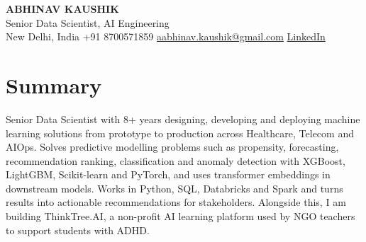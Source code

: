 \documentclass[10pt,a4paper]{article}
\begin{document}
\begin{center}
  {\LARGE\bfseries ABHINAV KAUSHIK}\\[2pt]
  {\large Senior Data Scientist, AI Engineering}\\[2pt]
  New Delhi, India \textbar{} +91 8700571859 \textbar{} \href{mailto:aabhinav.kaushik@gmail.com}{aabhinav.kaushik@gmail.com} \textbar{} \href{https://www.linkedin.com/in/abhinav-kaushik10/}{LinkedIn}  
\end{center}

\section{Summary}
Senior Data Scientist with 8+ years designing, developing and deploying machine learning solutions from prototype to production across Healthcare, Telecom and AIOps. Solves predictive modelling problems such as propensity, forecasting, recommendation ranking, classification and anomaly detection with XGBoost, LightGBM, Scikit-learn and PyTorch, and uses transformer embeddings in downstream models. Works in Python, SQL, Databricks and Spark and turns results into actionable recommendations for stakeholders. Alongside this, I am building ThinkTree.AI, a non-profit AI learning platform used by NGO teachers to support students with ADHD.
\end{document}
